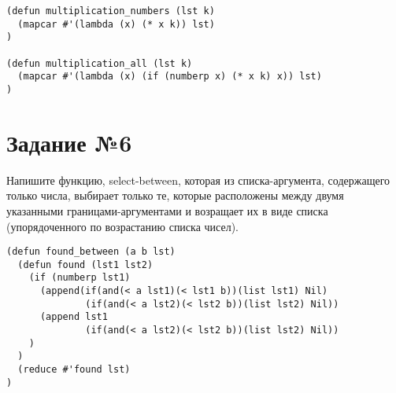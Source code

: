 \begin{lstlisting}
(defun multiplication_numbers (lst k)
  (mapcar #'(lambda (x) (* x k)) lst)
)

(defun multiplication_all (lst k)
  (mapcar #'(lambda (x) (if (numberp x) (* x k) x)) lst)
)
\end{lstlisting}
\section{Задание №6}

Напишите функцию, select-between, которая из списка-аргумента, содержащего
только числа, выбирает только те, которые расположены между двумя указанными
границами-аргументами и возращает их в виде списка (упорядоченного по
возрастанию списка чисел).

\begin{lstlisting}
(defun found_between (a b lst)
  (defun found (lst1 lst2)
    (if (numberp lst1)
      (append(if(and(< a lst1)(< lst1 b))(list lst1) Nil)
              (if(and(< a lst2)(< lst2 b))(list lst2) Nil))
      (append lst1
              (if(and(< a lst2)(< lst2 b))(list lst2) Nil))
    )
  )
  (reduce #'found lst)
)
\end{lstlisting}
